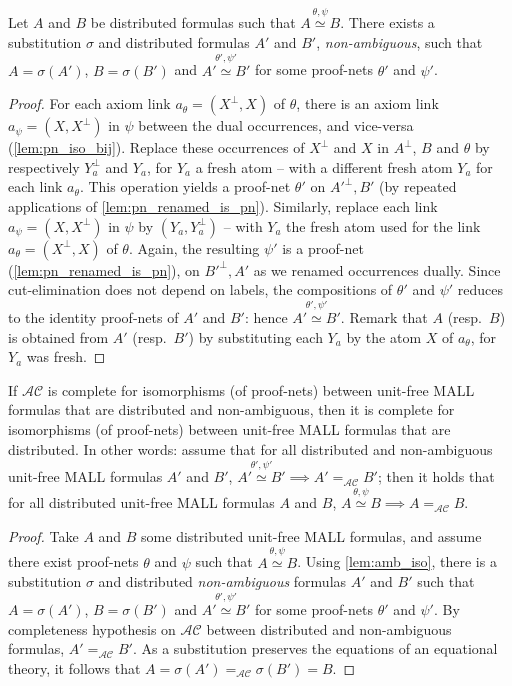 \documentclass{lmcs}
\newcommand*{\orth}{^\perp} %
\newcommand*{\resp}{resp.}
\newcommand*{\iso}{\mathrel{\simeq}} %
\newcommand*{\AC}{\mathcal{AC}} %
\newcommand*{\eqeq}{=} %
\newcommand*{\eqAC}{\eqeq_\AC} %
\newcommand{\isoproofs}[4]{\overset{\ensuremath{#3,#4}}{#1\iso #2}}
\begin{document}
\begin{lem}
\label{lem:amb_iso}
Let $A$ and $B$ be distributed formulas such that $\isoproofs{A}{B}{\theta}{\psi}$.
There exists a substitution $\sigma$ and distributed formulas $A'$ and $B'$, \emph{non-ambiguous}, such that $A=\sigma(A')$, $B=\sigma(B')$ and $\isoproofs{A'}{B'}{\theta'}{\psi'}$ for some proof-nets $\theta'$ and $\psi'$.
\end{lem}
\begin{proof}
For each axiom link $a_\theta = (X\orth, X)$ of $\theta$, there is an axiom link $a_\psi = (X, X\orth)$ in $\psi$ between the dual occurrences, and vice-versa (\autoref{lem:pn_iso_bij}).
Replace these occurrences of $X\orth$ and $X$ in $A\orth$, $B$ and $\theta$ by respectively $Y_a\orth$ and $Y_a$, for $Y_a$ a fresh atom -- with a different fresh atom $Y_a$ for each link $a_\theta$.
This operation yields a proof-net $\theta'$ on ${A'}\orth, B'$ (by repeated applications of \autoref{lem:pn_renamed_is_pn}).
Similarly, replace each link $a_\psi = (X, X\orth)$ in $\psi$ by $(Y_a, Y_a\orth)$ -- with $Y_a$ the fresh atom used for the link $a_\theta = (X\orth, X)$ of $\theta$.
Again, the resulting $\psi'$ is a proof-net (\autoref{lem:pn_renamed_is_pn}), on ${B'}\orth, A'$ as we renamed occurrences dually.
Since cut-elimination does not depend on labels, the compositions of $\theta'$ and $\psi'$ reduces to the identity proof-nets of $A'$ and $B'$: hence $\isoproofs{A'}{B'}{\theta'}{\psi'}$.
Remark that $A$ (\resp\ $B$) is obtained from $A'$ (\resp\ $B'$) by substituting each $Y_a$ by the atom $X$ of $a_\theta$, for $Y_a$ was fresh.
\end{proof}

\begin{prop}
\label{prop:red_to_non-amb}
If $\AC$ is complete for isomorphisms (of proof-nets) between unit-free MALL formulas that are distributed and non-ambiguous, then it is complete for isomorphisms (of proof-nets) between unit-free MALL formulas that are distributed.
In other words:
assume that for all distributed and non-ambiguous unit-free MALL formulas $A'$ and $B'$, $\isoproofs{A'}{B'}{\theta'}{\psi'} \implies A' \eqAC B'$;
then it holds that for all distributed unit-free MALL formulas $A$ and $B$, $\isoproofs{A}{B}{\theta}{\psi} \implies A \eqAC B$.
\end{prop}
\begin{proof}
Take $A$ and $B$ some distributed unit-free MALL formulas, and assume there exist proof-nets $\theta$ and $\psi$ such that $\isoproofs{A}{B}{\theta}{\psi}$.
Using \autoref{lem:amb_iso}, there is a substitution $\sigma$ and distributed \emph{non-ambiguous} formulas $A'$ and $B'$ such that $A=\sigma(A')$, $B=\sigma(B')$ and $\isoproofs{A'}{B'}{\theta'}{\psi'}$ for some proof-nets $\theta'$ and $\psi'$.
By completeness hypothesis on $\AC$ between distributed and non-ambiguous formulas, $A' \eqAC B'$.
As a substitution preserves the equations of an equational theory, it follows that $A = \sigma(A') \eqAC \sigma(B') = B$.
\end{proof}
\end{document}
